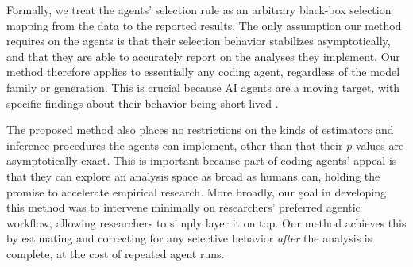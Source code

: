\documentclass[10pt]{article}
\begin{document}
Formally, we treat the agents' selection rule as an arbitrary black-box selection mapping from the data to the reported results.
The only assumption our method requires on the agents is that their selection behavior stabilizes asymptotically, and that they are able to accurately report on the analyses they implement. Our method therefore applies to essentially any coding agent, regardless of the model family or generation. This is crucial because AI agents are a moving target, with specific findings about their behavior being short-lived \citep{queen2026shelflife}.

The proposed method also places no restrictions on the kinds of estimators and inference procedures the agents can implement, other than that their $p$-values are asymptotically exact. This is important because part of coding agents' appeal is that they can explore an analysis space as broad as humans can, holding the promise to accelerate empirical research. More broadly, our goal in developing this method was to intervene minimally on researchers' preferred agentic workflow, allowing researchers to simply layer it on top. Our method achieves this by estimating and correcting for any selective behavior \textit{after} the analysis is complete, at the cost of repeated agent runs.
\end{document}
